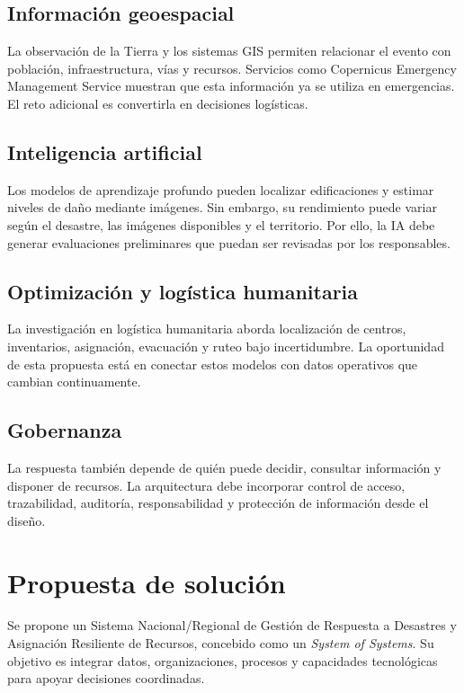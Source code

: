 \documentclass[11pt,a4paper]{article}
\begin{document}
\subsection{Información geoespacial}

La observación de la Tierra y los sistemas GIS permiten relacionar el evento
con población, infraestructura, vías y recursos. Servicios como Copernicus
Emergency Management Service muestran que esta información ya se utiliza en
emergencias. El reto adicional es convertirla en decisiones logísticas.

\subsection{Inteligencia artificial}

Los modelos de aprendizaje profundo pueden localizar edificaciones y estimar
niveles de daño mediante imágenes. Sin embargo, su rendimiento puede variar
según el desastre, las imágenes disponibles y el territorio. Por ello, la IA
debe generar evaluaciones preliminares que puedan ser revisadas por los
responsables.

\subsection{Optimización y logística humanitaria}

La investigación en logística humanitaria aborda localización de centros,
inventarios, asignación, evacuación y ruteo bajo incertidumbre. La oportunidad
de esta propuesta está en conectar estos modelos con datos operativos que
cambian continuamente.

\subsection{Gobernanza}

La respuesta también depende de quién puede decidir, consultar información y
disponer de recursos. La arquitectura debe incorporar control de acceso,
trazabilidad, auditoría, responsabilidad y protección de información desde el
diseño.

\section{Propuesta de solución}

Se propone un Sistema Nacional/Regional de Gestión de Respuesta a Desastres y
Asignación Resiliente de Recursos, concebido como un \emph{System of Systems}.
Su objetivo es integrar datos, organizaciones, procesos y capacidades
tecnológicas para apoyar decisiones coordinadas.
\end{document}
